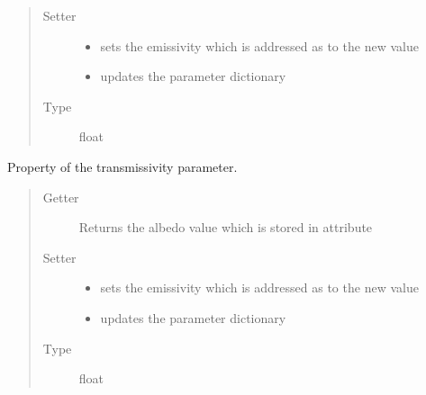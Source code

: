 \documentclass[a4paper,10pt,english]{sphinxmanual}
\begin{document}
\begin{fulllineitems}
\begin{fulllineitems}
\begin{quote}
\begin{description}
\item[{Setter}] \leavevmode\begin{itemize}
\item {} 
sets the emissivity which is addressed as 
to the new value

\item {} 
updates the parameter dictionary 

\end{itemize}

\item[{Type}] \leavevmode
float

\end{description}\end{quote}

\end{fulllineitems}


\begin{fulllineitems}
\label{api/climlab.radiation:climlab.radiation.Boltzmann.Boltzmann.tau}
Property of the transmissivity parameter.
\begin{quote}\begin{description}
\item[{Getter}] \leavevmode
Returns the albedo value which is stored in attribute 

\item[{Setter}] \leavevmode\begin{itemize}
\item {} 
sets the emissivity which is addressed as 
to the new value

\item {} 
updates the parameter dictionary 

\end{itemize}

\item[{Type}] \leavevmode
float

\end{description}\end{quote}

\end{fulllineitems}


\end{fulllineitems}
\end{document}
